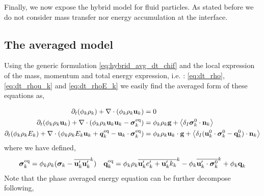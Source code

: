 
Finally, we now expose the hybrid model for fluid particles. 
As stated before we do not consider mass transfer nor energy accumulation at the interface. 

\subsection{The averaged model}

Using the generic formulation \ref{eq:hybrid_avg_dt_chif} and the local expression of the mass, momentum and total energy expression, i.e. : \ref{eq:dt_rho},\ref{eq:dt_rhou_k} and \ref{eq:dt_rhoE_k} we easily find the averaged form of these equations as, 

\begin{align}
    \label{eq:dt_&vg_rho}
    \partial_t (\phi_k \rho_k)  
    + \mathbf{\nabla}\cdot (
        \phi_k \rho_k\textbf{u}_k
    )
    &= 
    0\\
    \label{eq:dt_&vg_rhou_k}
    \partial_t (\phi_k \rho_k\textbf{u}_k)  
    + \mathbf{\nabla}\cdot (
        \phi_k \rho_k\textbf{u}_k\textbf{u}_k
        - \bm{\sigma}_k^\text{eq}
    )
    &= 
    \phi_k \rho_k \textbf{g} 
    +  \left<\delta_I \bm{\sigma}_k^0 \cdot \textbf{n}_k\right>\\
    \label{eq:dt_&vg_rhoE_k}
    \partial_t (\phi_k\rho_kE_k)  
    + \mathbf{\nabla}\cdot (
        \phi_k\rho_kE_k\textbf{u}_k
        + \bm{q}_k^\text{eq}
        - \textbf{u}_k \cdot \bm{\sigma}_k^\text{eq}
        )
    &= 
    \phi_k \rho_k\textbf{u}_k \cdot \textbf{g} 
    + \left<\delta_I (\textbf{u}_k^0 \cdot \bm{\sigma}_k^0 - \textbf{q}_k^0)\cdot \textbf{n}_k\right>
\end{align} 
where we have defined, 
\begin{align*}
    &\bm{\sigma}_k^\text{eq}
    = \phi_k\rho_k (
        \bm{\sigma}_k%
        - \kavg{\textbf{u}_k'\textbf{u}_k'})  
    &\textbf{q}_k^\text{eq}
    = \phi_k\rho_k \kavg{\textbf{u}_k' e_k' + \textbf{u}_k' k_k} - \phi_k\kavg{\textbf{u}_k' \cdot \bm{\sigma}_k^0}
    + \phi_k\textbf{q}_k \\
\end{align*}
Note that the phase averaged energy equation can be further decompose following, 
